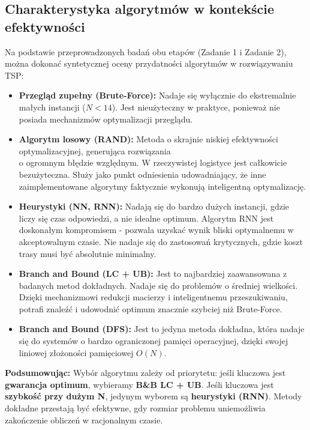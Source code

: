 \documentclass[conference]{IEEEtran}
\begin{document}
        \subsection{Charakterystyka algorytmów w kontekście efektywności}
            Na podstawie przeprowadzonych badań obu etapów (Zadanie 1 i Zadanie 2), można dokonać syntetycznej oceny przydatności algorytmów w rozwiązywaniu TSP:
            \begin{itemize}
                \item \textbf{Przegląd zupełny (Brute-Force):} Nadaje się wyłącznie do ekstremalnie małych instancji ($N < 14$). Jest nieużyteczny w praktyce, ponieważ nie posiada mechanizmów optymalizacji przeglądu.
                \item \textbf{Algorytm losowy (RAND):} Metoda o skrajnie niskiej efektywności optymalizacyjnej, generująca rozwiązania\\o ogromnym błędzie względnym. W rzeczywistej logistyce jest całkowicie bezużyteczna. Służy jako punkt odniesienia udowadniający, że inne zaimplementowane algorytmy faktycznie wykonują inteligentną optymalizację.
                \item \textbf{Heurystyki (NN, RNN):} Nadają się do bardzo dużych instancji, gdzie liczy się czas odpowiedzi, a nie idealne optimum. Algorytm RNN jest doskonałym kompromisem - pozwala uzyskać wynik bliski optymalnemu w akceptowalnym czasie. Nie nadaje się do zastosowań krytycznych, gdzie koszt trasy musi być absolutnie minimalny.
                \item \textbf{Branch and Bound (LC + UB):} Jest to najbardziej zaawansowana z badanych metod dokładnych. Nadaje się do problemów o średniej wielkości. Dzięki mechanizmowi redukcji macierzy i inteligentnemu przeszukiwaniu, potrafi znaleźć i udowodnić optimum znacznie szybciej niż Brute-Force.
                \item \textbf{Branch and Bound (DFS):} Jest to jedyna metoda dokładna, która nadaje się do systemów o bardzo ograniczonej pamięci operacyjnej, dzięki swojej liniowej złożoności pamięciowej $O(N)$.
            \end{itemize}
            \textbf{Podsumowując:} Wybór algorytmu zależy od priorytetu: jeśli kluczowa jest \textbf{gwarancja optimum}, wybieramy \textbf{B\&B LC + UB}. Jeśli kluczowa jest \textbf{szybkość przy dużym N}, jedynym wyborem są \textbf{heurystyki (RNN)}. Metody dokładne przestają być efektywne, gdy rozmiar problemu uniemożliwia zakończenie obliczeń w racjonalnym czasie.
\end{document}

